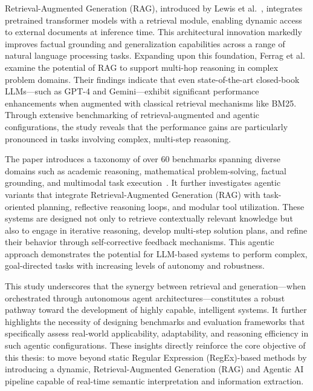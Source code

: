 Retrieval-Augmented Generation (RAG), introduced by Lewis et al.~\cite{lewis2020retrieval}, integrates pretrained transformer models with a retrieval module, enabling dynamic access to external documents at inference time. This architectural innovation markedly improves factual grounding and generalization capabilities across a range of natural language processing tasks. Expanding upon this foundation, Ferrag et al.~\cite{ferrag2025can} examine the potential of RAG to support multi-hop reasoning in complex problem domains. Their findings indicate that even state-of-the-art closed-book LLMs—such as GPT-4 and Gemini—exhibit significant performance enhancements when augmented with classical retrieval mechanisms like BM25. Through extensive benchmarking of retrieval-augmented and agentic configurations, the study reveals that the performance gains are particularly pronounced in tasks involving complex, multi-step reasoning.

\vspace{0.5cm}

The paper introduces a taxonomy of over 60 benchmarks spanning diverse domains such as academic reasoning, mathematical problem-solving, factual grounding, and multimodal task execution~\cite{ferrag2025can}. It further investigates agentic variants that integrate Retrieval-Augmented Generation (RAG) with task-oriented planning, reflective reasoning loops, and modular tool utilization. These systems are designed not only to retrieve contextually relevant knowledge but also to engage in iterative reasoning, develop multi-step solution plans, and refine their behavior through self-corrective feedback mechanisms. This agentic approach demonstrates the potential for LLM-based systems to perform complex, goal-directed tasks with increasing levels of autonomy and robustness.

\vspace{0.5cm}

This study underscores that the synergy between retrieval and generation—when orchestrated through autonomous agent architectures—constitutes a robust pathway toward the development of highly capable, intelligent systems. It further highlights the necessity of designing benchmarks and evaluation frameworks that specifically assess real-world applicability, adaptability, and reasoning efficiency in such agentic configurations. These insights directly reinforce the core objective of this thesis: to move beyond static Regular Expression (RegEx)-based methods by introducing a dynamic, Retrieval-Augmented Generation (RAG) and Agentic AI pipeline capable of real-time semantic interpretation and information extraction.

